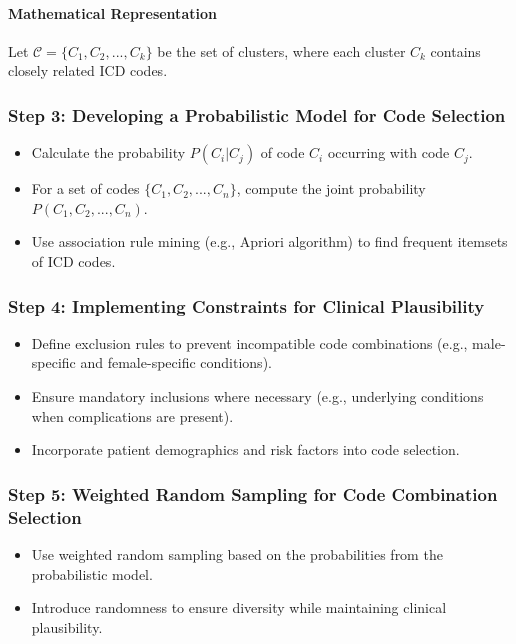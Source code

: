 \documentclass[12pt, a4paper]{article}
\begin{document}
\paragraph{Mathematical Representation}

Let \( \mathcal{C} = \{C_1, C_2, ..., C_k\} \) be the set of clusters, where each cluster \( C_k \) contains closely related ICD codes.

\subsubsection{Step 3: Developing a Probabilistic Model for Code Selection}

\begin{itemize}
    \item Calculate the probability \( P(C_i | C_j) \) of code \( C_i \) occurring with code \( C_j \).
    \item For a set of codes \( \{C_1, C_2, ..., C_n\} \), compute the joint probability \( P(C_1, C_2, ..., C_n) \).
    \item Use association rule mining (e.g., Apriori algorithm) to find frequent itemsets of ICD codes.
\end{itemize}

\subsubsection{Step 4: Implementing Constraints for Clinical Plausibility}

\begin{itemize}
    \item Define exclusion rules to prevent incompatible code combinations (e.g., male-specific and female-specific conditions).
    \item Ensure mandatory inclusions where necessary (e.g., underlying conditions when complications are present).
    \item Incorporate patient demographics and risk factors into code selection.
\end{itemize}

\subsubsection{Step 5: Weighted Random Sampling for Code Combination Selection}

\begin{itemize}
    \item Use weighted random sampling based on the probabilities from the probabilistic model.
    \item Introduce randomness to ensure diversity while maintaining clinical plausibility.
\end{itemize}
\end{document}
